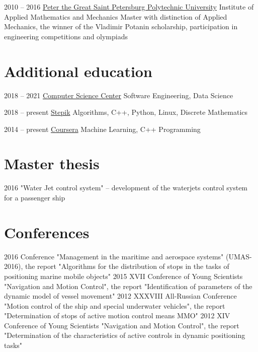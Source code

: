 \documentclass[11pt,a4paper]{moderncv}
\begin{document}
\cventry
    {2010 -- 2016}
    {\href{http://www.spbstu.ru/}{Peter the Great Saint Petersburg Polytechnic University}}
    {\newline Institute of Applied Mathematics and Mechanics}
    {\newline Master with distinction of Applied Mechanics,
    \newline the winner of the Vladimir Potanin scholarship,
    participation in engineering competitions and olympiads}
    {}
    {}
    
\section{Additional education}
\cventry
    {2018 -- 2021}
    {\href{https://compscicenter.ru/students/3977/}
    {Computer Science Center}}
    {Software Engineering, Data Science}
    {}
    {}
    {}

\cventry
    {2018 -- present}
    {\href{https://stepik.org/users/57620777}{Stepik}}
    {Algorithms, C++, Python, Linux, Discrete Mathematics}
    {}
    {}
    {}

\cventry
    {2014 -- present}
    {\href{https://www.coursera.org/user/6824f02bb7dea6b34f4c85686333f84c}{Coursera}}
    {Machine Learning, C++ Programming}
    {}
    {}
    {}

\section{Master thesis}
\cvline
    {2016}
    {"Water Jet control system" -- development of the waterjets control system for a passenger ship}

\section{Conferences}
\cvline
    {2016}
    {Conference "Management in the maritime and aerospace systems" (UMAS-2016),
    the report "Algorithms for the distribution of stops in the tasks of positioning marine mobile objects"}
\cvline
    {2015}
    {XVII Conference of Young Scientists "Navigation and Motion Control",
    the report "Identification of parameters of the dynamic model of vessel movement"}
\cvline
    {2012}
    {XXXVIII All-Russian Conference "Motion control of the ship and special underwater vehicles",
    the report "Determination of stops of active motion control means MMO"}
\cvline
    {2012}
    {XIV Conference of Young Scientists "Navigation and Motion Control",
    the report "Determination of the characteristics of active controls in dynamic positioning tasks"}
\end{document}
